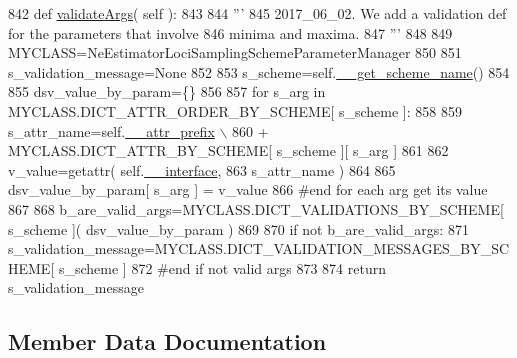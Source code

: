 \begin{DoxyCode}
842     \textcolor{keyword}{def }\hyperlink{classnegui_1_1pgutilityclasses_1_1NeEstimatorLociSamplingSchemeParameterManager_a6dd33d7bf346f1d75a3cfa67373d3276}{validateArgs}( self ):
843 
844         \textcolor{stringliteral}{'''}
845 \textcolor{stringliteral}{        2017\_06\_02.  We add a validation def for the parameters that involve}
846 \textcolor{stringliteral}{        minima and maxima.}
847 \textcolor{stringliteral}{        '''}
848 
849         MYCLASS=NeEstimatorLociSamplingSchemeParameterManager
850         
851         s\_validation\_message=\textcolor{keywordtype}{None}
852 
853         s\_scheme=self.\hyperlink{classnegui_1_1pgutilityclasses_1_1NeEstimatorLociSamplingSchemeParameterManager_a9d86dcb2900099be09b0310a5b987dec}{\_\_get\_scheme\_name}()
854         
855         dsv\_value\_by\_param=\{\}
856 
857         \textcolor{keywordflow}{for} s\_arg \textcolor{keywordflow}{in} MYCLASS.DICT\_ATTR\_ORDER\_BY\_SCHEME[ s\_scheme ]:
858 
859             s\_attr\_name=self.\hyperlink{classnegui_1_1pgutilityclasses_1_1NeEstimatorLociSamplingSchemeParameterManager_afcab6e5ad53959295c0578ccc635f9cb}{\_\_attr\_prefix} \(\backslash\)
860                     + MYCLASS.DICT\_ATTR\_BY\_SCHEME[ s\_scheme ][ s\_arg ]
861 
862             v\_value=getattr( self.\hyperlink{classnegui_1_1pgutilityclasses_1_1NeEstimatorLociSamplingSchemeParameterManager_a1fe9113d08f24a9ae682195cd470852d}{\_\_interface}, 
863                                     s\_attr\_name )
864 
865             dsv\_value\_by\_param[ s\_arg ] = v\_value
866         \textcolor{comment}{#end for each arg get its value}
867 
868         b\_are\_valid\_args=MYCLASS.DICT\_VALIDATIONS\_BY\_SCHEME[ s\_scheme ]( dsv\_value\_by\_param )
869 
870         \textcolor{keywordflow}{if} \textcolor{keywordflow}{not} b\_are\_valid\_args:
871             s\_validation\_message=MYCLASS.DICT\_VALIDATION\_MESSAGES\_BY\_SCHEME[ s\_scheme ]
872         \textcolor{comment}{#end if not valid args}
873         
874         \textcolor{keywordflow}{return} s\_validation\_message
\end{DoxyCode}


\subsection{Member Data Documentation}
